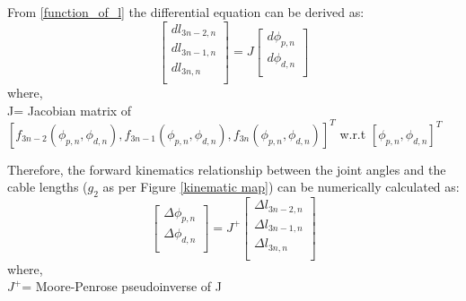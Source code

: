 \documentclass[a4paper,12pt]{report}
\begin{document}
From \ref{function_of_l} the differential equation can be derived as: 
\begin{equation*}
\begin{bmatrix}
dl_{3n-2,n}\\
dl_{3n-1,n}\\
dl_{3n,n}\\
\end{bmatrix} = J
\begin{bmatrix}
d\phi_{p,n}\\
d\phi_{d,n}\\
\end{bmatrix}
\label{differential_of_l}
\end{equation*}
where,\\
\indent J= Jacobian matrix of $[f_{3n-2}(\phi_{p,n},\phi_{d,n}),f_{3n-1}(\phi_{p,n},\phi_{d,n}),f_{3n}(\phi_{p,n},\phi_{d,n})]^{T}$ w.r.t $[\phi_{p,n},\phi_{d,n}]^{T}$

Therefore, the forward kinematics relationship between the joint angles and the cable lengths ($g_{2}$ as per Figure \ref{kinematic map}) can be numerically calculated as:
\begin{equation}
	 \begin{bmatrix}
	 \Delta \phi_{p,n}\\
	 \Delta \phi_{d,n}\\
	 \end{bmatrix}
	 = J^{+}
	 \begin{bmatrix}
	 \Delta l_{3n-2,n}\\
	 \Delta l_{3n-1,n}\\
	 \Delta l_{3n,n}\\
	 \end{bmatrix}
	\label{g2}
\end{equation}
where,\\
\indent $J^{+}$= Moore-Penrose pseudoinverse of J
\end{document}

